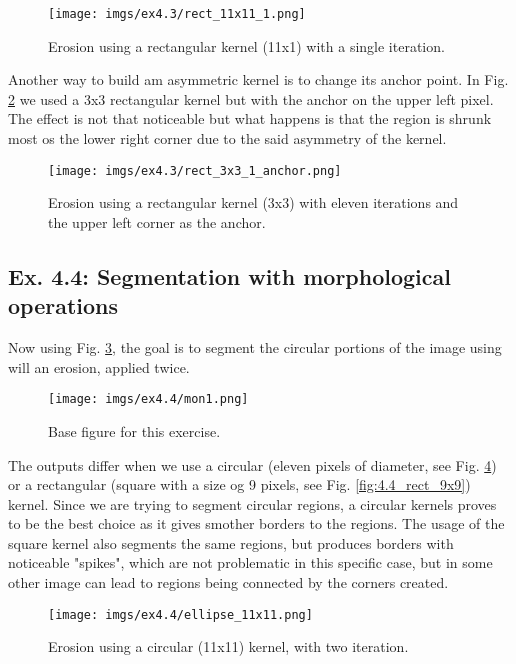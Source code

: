 \documentclass[journal]{IEEEtran}
\begin{document}
\begin{figure}[htp]
  \centering
  \texttt{[image: imgs/ex4.3/rect\_11x11\_1.png]}
  \caption{Erosion using a rectangular kernel (11x1) with a single iteration.}
  \label{fig:4.3_rect_11x1_1}
\end{figure}
\FloatBarrier

Another way to build am asymmetric kernel is to change its anchor point. In Fig. \ref{fig:4.3_rect_3x3_1_anchor} we used a 3x3 rectangular kernel but with the anchor on the upper left pixel. The effect is not that noticeable but what happens is that the region is shrunk most os the lower right corner due to the said asymmetry of the kernel.

\begin{figure}[htp]
  \centering
  \texttt{[image: imgs/ex4.3/rect\_3x3\_1\_anchor.png]}
  \caption{Erosion using a rectangular kernel (3x3) with eleven iterations and the upper left corner as the anchor.}
  \label{fig:4.3_rect_3x3_1_anchor}
\end{figure}
\FloatBarrier

\subsection{Ex. 4.4: Segmentation with morphological operations}

Now using Fig. \ref{fig:4.4_base}, the goal is to segment the circular portions of the image using will an erosion, applied twice. 

\begin{figure}[htp]
  \centering
  \texttt{[image: imgs/ex4.4/mon1.png]}
  \caption{Base figure for this exercise.}
  \label{fig:4.4_base}
\end{figure}
\FloatBarrier

The outputs differ when we use a circular (eleven pixels of diameter, see Fig. \ref{fig:4.4_ellipse_11x11}) or a rectangular (square with a size og 9 pixels, see Fig. \ref{fig:4.4_rect_9x9}) kernel. Since we are trying to segment circular regions, a circular kernels proves to be the best choice as it gives smother borders to the regions. The usage of the square kernel also segments the same regions, but produces borders with noticeable "spikes", which are not problematic in this specific case, but in some other image can lead to regions being connected by the corners created. 

\begin{figure}[htp]
  \centering
  \texttt{[image: imgs/ex4.4/ellipse\_11x11.png]}
  \caption{Erosion using a circular (11x11) kernel, with two iteration.}
  \label{fig:4.4_ellipse_11x11}
\end{figure}
\FloatBarrier
\end{document}
